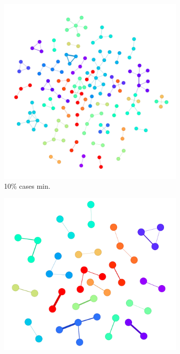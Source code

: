 \begin{figure}[!ht]
    \centering
	\begin{subfigure}[b]{0.30\linewidth}
		\includegraphics[width=\linewidth]{Minor Thesis/figures/graphs/main/g95102028.png}
		\caption{10\% cases min.}
	\end{subfigure}
	\hfill
	\begin{subfigure}[b]{0.30\linewidth}
		\includegraphics[width=\linewidth]{Minor Thesis/figures/graphs/main/g95202028.png}

\end{subfigure}
\end{figure}
